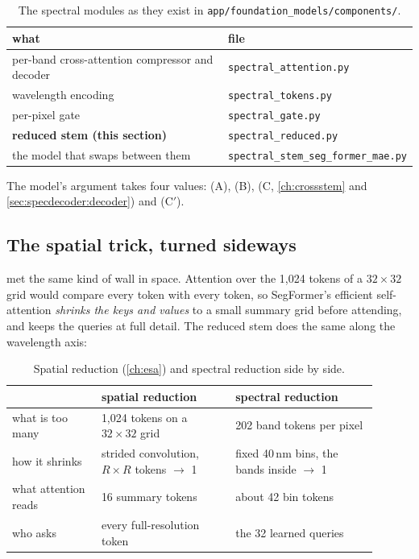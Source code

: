 \begin{table}[htbp]\centering
\caption{The spectral modules as they exist in \texttt{app/foundation\_models/components/}.}\label{tab:specdecoder:files}
\begin{tabular}{ll}\toprule
what & file\\\midrule
per-band cross-attention compressor and decoder & \texttt{spectral\_attention.py}\\
wavelength encoding & \texttt{spectral\_tokens.py}\\
per-pixel gate & \texttt{spectral\_gate.py}\\
\textbf{reduced stem (this section)} & \texttt{spectral\_reduced.py}\\
the model that swaps between them & \texttt{spectral\_stem\_seg\_former\_mae.py}\\\bottomrule
\end{tabular}
\end{table}

The model's  argument takes four values:  (A),  (B),  (C, \cref{ch:crossstem} and \cref{sec:specdecoder:decoder}) and  (C$'$).

\subsection{The spatial trick, turned sideways}

 met the same kind of wall in space. Attention over the 1,024 tokens of a $32\times32$ grid would compare every token with every token, so SegFormer's efficient self-attention \citep{xie2021segformer} \emph{shrinks the keys and values} to a small summary grid before attending, and keeps the queries at full detail. The reduced stem does the same along the wavelength axis:

\begin{table}[htbp]\centering
\caption{Spatial reduction (\cref{ch:esa}) and spectral reduction side by side.}\label{tab:specdecoder:sideways}
\begin{tabular}{p{0.22\linewidth}p{0.33\linewidth}p{0.35\linewidth}}\toprule
 & spatial reduction & spectral reduction\\\midrule
what is too many & 1,024 tokens on a $32\times32$ grid & 202 band tokens per pixel\\
how it shrinks & strided convolution, $R\times R$ tokens $\to$ 1 & fixed 40\,nm bins, the bands inside $\to$ 1\\
what attention reads & 16 summary tokens & about 42 bin tokens\\
who asks & every full-resolution token & the 32 learned queries\\\bottomrule
\end{tabular}
\end{table}

